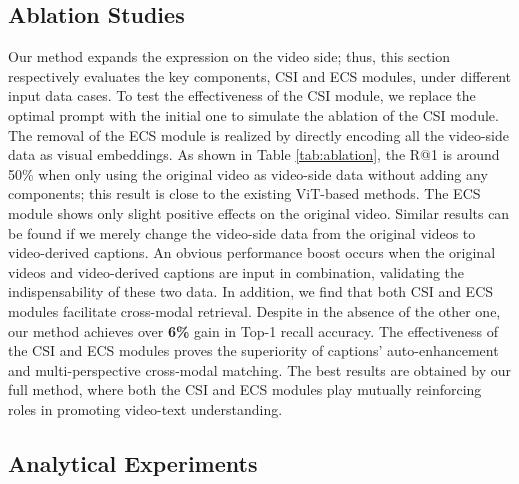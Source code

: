 

\subsection{Ablation Studies}
Our method expands the expression on the video side; thus, this section respectively evaluates the key components, CSI and ECS modules, under different input data cases. To test the effectiveness of the CSI module, we replace the optimal prompt with the initial one to simulate the ablation of the CSI module.  
The removal of the ECS module is realized by directly encoding all the video-side data as visual embeddings. 
As shown in Table \ref{tab:ablation}, the R@1 is around 50\% when only using the original video as video-side data without adding any components; this result is close to the existing ViT-based methods. The ECS module shows only slight positive effects on the original video.  
Similar results can be found if we merely change the video-side data from the original videos to video-derived captions. An obvious performance boost occurs when the original videos and video-derived captions are input in combination, validating the indispensability of these two data. 
In addition, we find that both CSI and ECS modules facilitate cross-modal retrieval. Despite in the absence of the other one, our method achieves over \textbf{6\%} gain in Top-1 recall accuracy. The effectiveness of the CSI and ECS modules proves the superiority of captions' auto-enhancement and multi-perspective cross-modal matching. The best results are obtained by our full method, where both the CSI and ECS modules play mutually reinforcing roles in promoting video-text understanding.

\subsection{Analytical Experiments}


